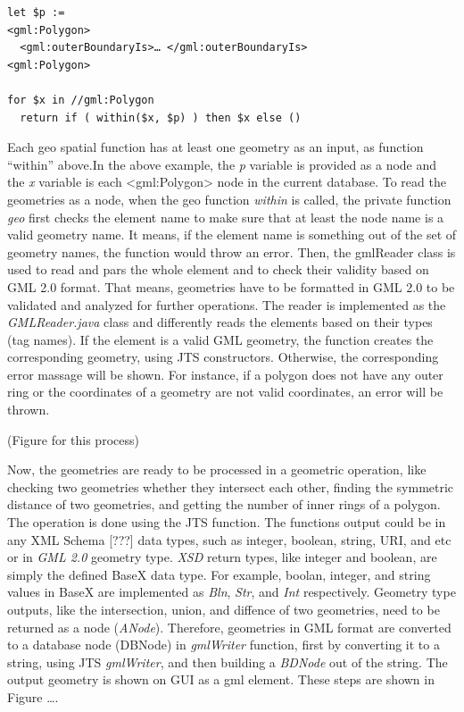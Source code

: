 \documentclass[a4paper,12pt]{article}
\begin{document}
\begin{verbatim}
let $p := 
<gml:Polygon>
  <gml:outerBoundaryIs>… </gml:outerBoundaryIs>
<gml:Polygon>
	
for $x in //gml:Polygon
  return if ( within($x, $p) ) then $x else ()
\end{verbatim}

Each geo spatial function has at least one geometry as an input, as function “within” above.In the above example, the \textit{p} variable is provided as a node and the \textit{x} variable is each <gml:Polygon> node in the current database. To read the geometries as a node, when the geo function \textit{within} is called, the private function \textit{geo} first checks the element name to make sure that at least the node name is a valid geometry name. It means, if the element name is something out of the set of geometry names, the function would throw an error. 
Then, the gmlReader class is used to read and pars the whole element and to check their validity based on GML 2.0 format. That means, geometries have to be formatted in GML 2.0 to be validated and analyzed for further operations. The reader is implemented as the \textit{GMLReader.java} class and differently reads the elements based on their types (tag names). If the element is a valid GML geometry, the function creates the corresponding geometry, using JTS constructors. Otherwise, the corresponding error massage will be shown. For instance, if a polygon does not have any outer ring or the coordinates of a geometry are not valid coordinates, an error will be thrown. 

(Figure for this process)

Now, the geometries are ready to be processed in a geometric operation, like checking two geometries whether they intersect each other, finding the symmetric distance of two geometries, and getting the number of inner rings of a polygon. The operation is done using the JTS function. The functions output could be in any XML Schema [???] data types, such as integer, boolean, string, URI, and etc or in \textit{GML 2.0} geometry type. \textit{XSD} return types, like integer and boolean, are simply the defined BaseX data type. For example, boolan, integer, and string values in BaseX are implemented as \textit{Bln}, \textit{Str}, and \textit{Int} respectively. Geometry type outputs, like the intersection, union, and diffence of two geometries, need to be returned as a node (\textit{ANode}). Therefore, geometries in GML format are converted to a database node (DBNode) in \textit{gmlWriter} function, first by converting it to a string, using JTS \textit{gmlWriter}, and then building a \textit{BDNode} out of the string. The output geometry is shown on GUI as a gml element. These steps are shown in Figure ….
\end{document}
